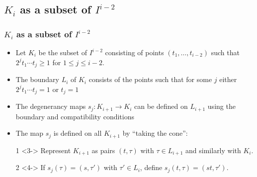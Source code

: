 \documentclass{beamer}
\theoremstyle{definition}
\begin{document}
\subsection{$K_i$ as a subset of $I^{i-2}$}
\begin{frame}
\frametitle{$K_i$ as a subset of $I^{i-2}$}
\begin{itemize}
\item<1-> Let $K_i$ be the subset of $I^{i-2}$ consisting of points $(t_1,\dots, t_{i-2})$ such that $2^jt_1\cdots t_j\geq 1$ for $1\leq j\leq i-2$.
\item<2-> The boundary $L_i$ of $K_i$ consists of the points such that for some $j$ either $2^jt_1\cdots t_j= 1$ or $t_j=1$ %
\end{itemize}
\end{frame}
\begin{frame}

\end{frame}
\begin{frame}

\end{frame}
\begin{frame}
\begin{itemize}
\item<1-> The degenerancy maps $s_j:K_{i+1}\to K_i$ can be defined on $L_{i+1}$ using the boundary and compatibility conditions
\item<2->The map $s_j$ is defined on all $K_{i+1}$ by ``taking the cone'':
\item[1]<3-> Represent $K_{i+1}$ as pairs $(t,\tau)$ with $\tau\in L_{i+1}$ and similarly with $K_i$.
\item[2]<4-> If $s_j(\tau)=(s,\tau')$ with $\tau'\in L_i$, define $s_j(t,\tau)=(st,\tau')$. %
\end{itemize}
\end{frame}
\end{document}
